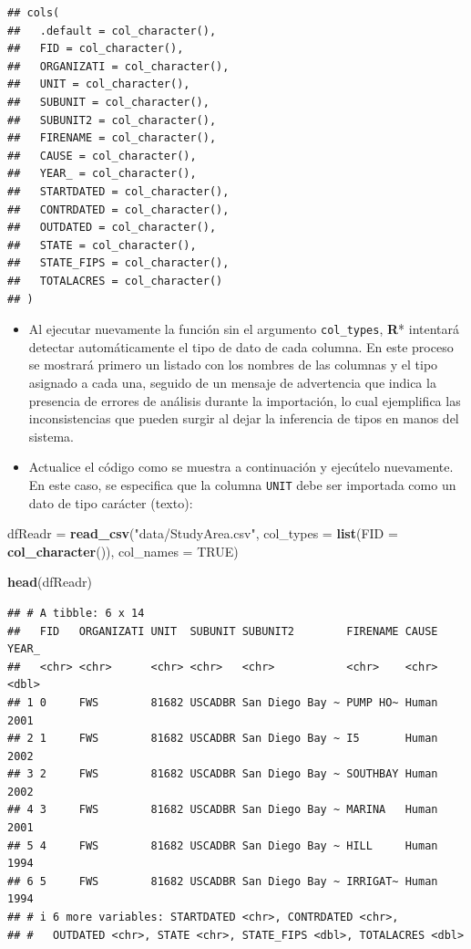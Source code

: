 \documentclass[
]{book}
\newenvironment{Shaded}{\begin{snugshade}}{\end{snugshade}}
\newcommand{\AttributeTok}[1]{\textcolor[rgb]{0.13,0.29,0.53}{#1}}
\newcommand{\ConstantTok}[1]{\textcolor[rgb]{0.56,0.35,0.01}{#1}}
\newcommand{\FunctionTok}[1]{\textcolor[rgb]{0.13,0.29,0.53}{\textbf{#1}}}
\newcommand{\NormalTok}[1]{#1}
\newcommand{\OtherTok}[1]{\textcolor[rgb]{0.56,0.35,0.01}{#1}}
\newcommand{\StringTok}[1]{\textcolor[rgb]{0.31,0.60,0.02}{#1}}
\begin{document}
\begin{verbatim}
## cols(
##   .default = col_character(),
##   FID = col_character(),
##   ORGANIZATI = col_character(),
##   UNIT = col_character(),
##   SUBUNIT = col_character(),
##   SUBUNIT2 = col_character(),
##   FIRENAME = col_character(),
##   CAUSE = col_character(),
##   YEAR_ = col_character(),
##   STARTDATED = col_character(),
##   CONTRDATED = col_character(),
##   OUTDATED = col_character(),
##   STATE = col_character(),
##   STATE_FIPS = col_character(),
##   TOTALACRES = col_character()
## )
\end{verbatim}

\begin{itemize}
\item
  Al ejecutar nuevamente la función sin el argumento \texttt{col\_types}, \textbf{R}* intentará detectar automáticamente el tipo de dato de cada columna. En este proceso se mostrará primero un listado con los nombres de las columnas y el tipo asignado a cada una, seguido de un mensaje de advertencia que indica la presencia de errores de análisis durante la importación, lo cual ejemplifica las inconsistencias que pueden surgir al dejar la inferencia de tipos en manos del sistema.
\item
  Actualice el código como se muestra a continuación y ejecútelo nuevamente. En este caso, se especifica que la columna \texttt{UNIT} debe ser importada como un dato de tipo carácter (texto):
\end{itemize}

\begin{Shaded}
\begin{Highlighting}[]
\NormalTok{dfReadr }\OtherTok{=} \FunctionTok{read\_csv}\NormalTok{(}\StringTok{"data/StudyArea.csv"}\NormalTok{, }
                   \AttributeTok{col\_types =} \FunctionTok{list}\NormalTok{(}\AttributeTok{FID =} \FunctionTok{col\_character}\NormalTok{()),}
                   \AttributeTok{col\_names =} \ConstantTok{TRUE}\NormalTok{)                }

\FunctionTok{head}\NormalTok{(dfReadr)}
\end{Highlighting}
\end{Shaded}

\begin{verbatim}
## # A tibble: 6 x 14
##   FID   ORGANIZATI UNIT  SUBUNIT SUBUNIT2        FIRENAME CAUSE YEAR_
##   <chr> <chr>      <chr> <chr>   <chr>           <chr>    <chr> <dbl>
## 1 0     FWS        81682 USCADBR San Diego Bay ~ PUMP HO~ Human  2001
## 2 1     FWS        81682 USCADBR San Diego Bay ~ I5       Human  2002
## 3 2     FWS        81682 USCADBR San Diego Bay ~ SOUTHBAY Human  2002
## 4 3     FWS        81682 USCADBR San Diego Bay ~ MARINA   Human  2001
## 5 4     FWS        81682 USCADBR San Diego Bay ~ HILL     Human  1994
## 6 5     FWS        81682 USCADBR San Diego Bay ~ IRRIGAT~ Human  1994
## # i 6 more variables: STARTDATED <chr>, CONTRDATED <chr>,
## #   OUTDATED <chr>, STATE <chr>, STATE_FIPS <dbl>, TOTALACRES <dbl>
\end{verbatim}
\end{document}
